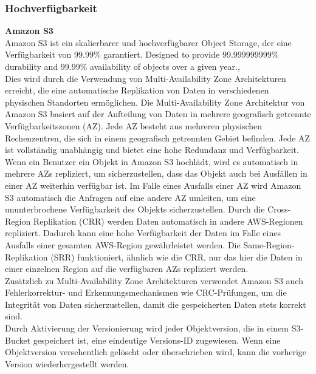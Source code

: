 \newpage

\subsubsection{Hochverfügbarkeit}

\textbf{Amazon S3}\\

Amazon S3 ist ein skalierbarer und hochverfügbarer Object Storage, der eine Verfügbarkeit von 99.99\% garantiert. \glqq Designed to provide 99.999999999\% durability and 99.99\% availability of objects over a given year.\grqq, \cite{aws-availability}\\

Dies wird durch die Verwendung von Multi-Availability Zone Architekturen erreicht, die eine automatische Replikation von Daten in verschiedenen physischen Standorten ermöglichen. Die Multi-Availability Zone Architektur von Amazon S3 basiert auf der Aufteilung von Daten in mehrere geografisch getrennte Verfügbarkeitszonen (AZ). Jede AZ besteht aus mehreren physischen Rechenzentren, die sich in einem geografisch getrennten Gebiet befinden. Jede AZ ist vollständig unabhängig und bietet eine hohe Redundanz und Verfügbarkeit. Wenn ein Benutzer ein Objekt in Amazon S3 hochlädt, wird es automatisch in mehrere AZs repliziert, um sicherzustellen, dass das Objekt auch bei Ausfällen in einer AZ weiterhin verfügbar ist. Im Falle eines Ausfalls einer AZ wird Amazon S3 automatisch die Anfragen auf eine andere AZ umleiten, um eine ununterbrochene Verfügbarkeit des Objekts sicherzustellen. Durch die Cross-Region Replikation (CRR) werden Daten automatisch in andere AWS-Regionen repliziert. Dadurch kann eine hohe Verfügbarkeit der Daten im Falle eines Ausfalls einer gesamten AWS-Region gewährleistet werden. Die Same-Region-Replikation (SRR) funktioniert, ähnlich wie die CRR, nur das hier die Daten in einer einzelnen Region auf die verfügbaren AZs repliziert werden.\\

Zusätzlich zu Multi-Availability Zone Architekturen verwendet Amazon S3 auch Fehlerkorrektur- und Erkennungsmechanismen wie CRC-Prüfungen, um die Integrität von Daten sicherzustellen, damit die gespeicherten Daten stets korrekt sind.\\

Durch Aktivierung der Versionierung wird jeder Objektversion, die in einem S3-Bucket gespeichert ist, eine eindeutige Versions-ID zugewiesen. Wenn eine Objektversion versehentlich gelöscht oder überschrieben wird, kann die vorherige Version wiederhergestellt werden.\\

